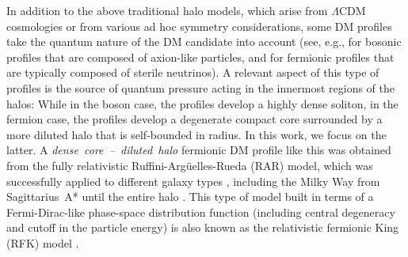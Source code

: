 \documentclass[referee]{aa} %
\begin{document}
In addition to the above traditional halo models, which arise from $\Lambda$CDM cosmologies or from various ad hoc symmetry considerations, some DM profiles take the quantum nature of the DM candidate into account (see, e.g., \cite{2014NatPh..10..496S} for bosonic profiles that are composed of axion-like particles, and \cite{2015MNRAS.451..622R,2015PhRvD..92l3527C,2021MNRAS.502.4227A} for fermionic profiles that are typically composed of sterile neutrinos). A relevant aspect of this type of profiles is the source of quantum pressure acting in the innermost regions of the halos: While in the boson case, the profiles develop a highly dense soliton, in the fermion case, the profiles develop a degenerate compact core surrounded by a more diluted halo that is self-bounded in radius. In this work, we focus on the latter. A \emph{dense~core~--~diluted~halo} fermionic DM profile like this was obtained from the fully relativistic Ruffini-Argüelles-Rueda (RAR) model, which was successfully applied to different galaxy types \citep{2019PDU....24..278A,2023ApJ...945....1K}, including the Milky Way from Sagittarius~A* until the entire halo \citep{arguelles_novel_2018,2020A&A...641A..34B,2021MNRAS.505L..64B,2022MNRAS.511L..35A}.
This type of model built in terms of a Fermi-Dirac-like phase-space distribution function (including central degeneracy and cutoff in the particle energy) is also known as the relativistic fermionic King (RFK) model \citep{2022PhRvD.106d3538C}.

\end{document}

